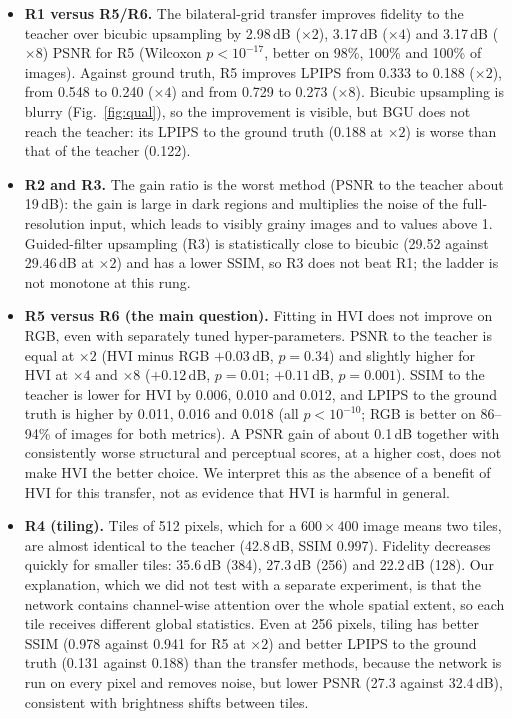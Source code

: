 \documentclass[runningheads]{llncs}
\begin{document}
\begin{itemize}
\item \textbf{R1 versus R5/R6.} The bilateral-grid transfer improves fidelity to the teacher over bicubic upsampling by 2.98\,dB ($\times2$), 3.17\,dB ($\times4$) and 3.17\,dB ($\times8$) PSNR for R5 (Wilcoxon $p<10^{-17}$, better on 98\%, 100\% and 100\% of images). Against ground truth, R5 improves LPIPS from 0.333 to 0.188 ($\times2$), from 0.548 to 0.240 ($\times4$) and from 0.729 to 0.273 ($\times8$). Bicubic upsampling is blurry (Fig.~\ref{fig:qual}), so the improvement is visible, but BGU does not reach the teacher: its LPIPS to the ground truth (0.188 at $\times2$) is worse than that of the teacher (0.122).
\item \textbf{R2 and R3.} The gain ratio is the worst method (PSNR to the teacher about 19\,dB): the gain is large in dark regions and multiplies the noise of the full-resolution input, which leads to visibly grainy images and to values above 1. Guided-filter upsampling (R3) is statistically close to bicubic (29.52 against 29.46\,dB at $\times2$) and has a lower SSIM, so R3 does not beat R1; the ladder is not monotone at this rung.
\item \textbf{R5 versus R6 (the main question).} Fitting in HVI does not improve on RGB, even with separately tuned hyper-parameters. PSNR to the teacher is equal at $\times2$ (HVI minus RGB $+0.03$\,dB, $p=0.34$) and slightly higher for HVI at $\times4$ and $\times8$ ($+0.12$\,dB, $p=0.01$; $+0.11$\,dB, $p=0.001$). SSIM to the teacher is lower for HVI by 0.006, 0.010 and 0.012, and LPIPS to the ground truth is higher by 0.011, 0.016 and 0.018 (all $p<10^{-10}$; RGB is better on 86--94\% of images for both metrics). A PSNR gain of about 0.1\,dB together with consistently worse structural and perceptual scores, at a higher cost, does not make HVI the better choice. We interpret this as the absence of a benefit of HVI for this transfer, not as evidence that HVI is harmful in general.
\item \textbf{R4 (tiling).} Tiles of 512 pixels, which for a $600{\times}400$ image means two tiles, are almost identical to the teacher (42.8\,dB, SSIM 0.997). Fidelity decreases quickly for smaller tiles: 35.6\,dB (384), 27.3\,dB (256) and 22.2\,dB (128). Our explanation, which we did not test with a separate experiment, is that the network contains channel-wise attention over the whole spatial extent, so each tile receives different global statistics. Even at 256 pixels, tiling has better SSIM (0.978 against 0.941 for R5 at $\times2$) and better LPIPS to the ground truth (0.131 against 0.188) than the transfer methods, because the network is run on every pixel and removes noise, but lower PSNR (27.3 against 32.4\,dB), consistent with brightness shifts between tiles.

\end{itemize}
\end{document}
